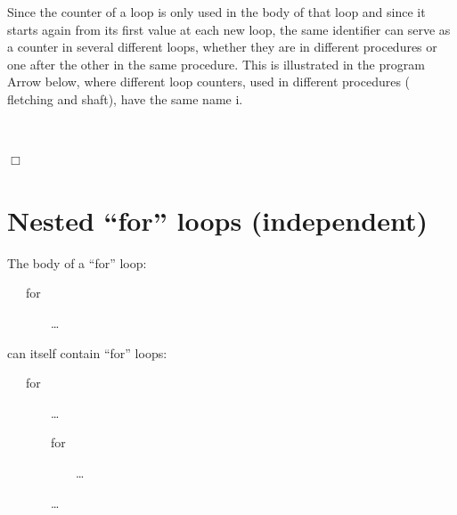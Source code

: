 Since the counter of a loop is only used in the body of that loop and since it
starts again from its first value at each new loop, the same
identifier can serve as a counter in several different loops,
whether they are in different procedures or one after the other
in the same procedure. This is illustrated in the program
{\idt Arrow} below, where different loop
counters, used in different procedures ({\idt
fletching} and {\idt shaft}), have the same name {\idt i}.

\noindent\begin{minipage}{\textwidth}
\begin{exemple}[Arrow]{\rm \ \\[7cm]
%
\vspace*{-7cm}%

\noindent $\Box$ }\end{exemple}
\end{minipage}


\section{Nested ``for'' loops (in\-de\-pen\-dent)}

The body of a ``for'' loop:

\mbox{\blc\ \ \ {\mcl for}\hspace{0.3em}\blanc\hspace{0.3em}{\small\rm Identifier1}\hspace{0.3em}\blanc\hspace{0.3em}{\mcl in}\hspace{0.3em}\blanc{}}\par
\mbox{\blc\ \ \ \ \ \ \ \small\rm  \ldots}\par

\noindent can itself contain ``for'' loops:

\mbox{\blc\ \ \ {\mcl for}\hspace{0.3em}\blanc\hspace{0.3em}{\small\rm Identifier1}\hspace{0.3em}\blanc\hspace{0.3em}{\mcl in}\hspace{0.3em}\blanc{}}\par
\mbox{\blc\ \ \ \ \ \ \ \small\rm  \ldots}\par
\mbox{\blc\ \ \ \ \ \ \ {\mcl for}\hspace{0.3em}\blanc\hspace{0.3em}{\small\rm Identifier2}\hspace{0.3em}\blanc\hspace{0.3em}{\mcl in}\hspace{0.3em}\blanc{}}\par
\mbox{\blc\ \ \ \ \ \ \ \ \ \ \ \small\rm  \ldots}\par
\mbox{\blc\ \ \ \ \ \ \ \small\rm  \ldots}\par

